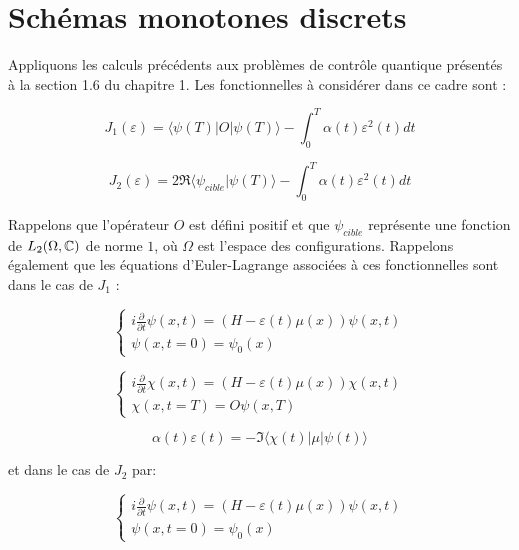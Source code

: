 \chapter{Schémas monotones discrets}

Appliquons les calculs précédents aux problèmes de contrôle quantique présentés à la section 1.6 du chapitre 1. Les fonctionnelles à considérer dans ce cadre sont :

\begin{equation}
J_1(\varepsilon) = \langle \psi(T)|O|\psi(T) \rangle - \int_0^T \alpha(t)\varepsilon^2(t)dt
\end{equation}

\begin{equation}
J_2(\varepsilon) = 2\Re\langle \psi_{cible}|\psi(T)\rangle - \int_0^T \alpha(t)\varepsilon^2(t)dt
\end{equation}

Rappelons que l'opérateur $O$ est défini positif et que $\psi_{cible}$ représente une fonction de $L_2(\Omega,\mathbb C)$ de norme $1$, où $\Omega$ est l'espace des configurations. Rappelons également que les équations d'Euler-Lagrange associées à ces fonctionnelles sont dans le cas de $J_1$ :

\begin{equation}
\begin{cases}
i \frac{\partial}{\partial t} \psi (x,t) = (H - \varepsilon(t)\mu(x))\psi(x,t)\\
\psi(x,t=0)=\psi_0(x)
\end{cases}
\end{equation}

\begin{equation}
\begin{cases}
i \frac{\partial}{\partial t} \chi (x,t) = (H - \varepsilon(t)\mu(x))\chi(x,t)\\
\chi(x,t=T)=O\psi(x,T)
\end{cases}
\end{equation}

\begin{equation}
\alpha(t)\varepsilon(t) = -\Im \langle \chi(t)|\mu|\psi(t)\rangle 
\end{equation}

et dans le cas de $J_2$ par:

\begin{equation}
\begin{cases}
i \frac{\partial}{\partial t} \psi (x,t) = (H - \varepsilon(t)\mu(x))\psi(x,t)\\
\psi(x,t=0)=\psi_0(x)
\end{cases}
\end{equation}

